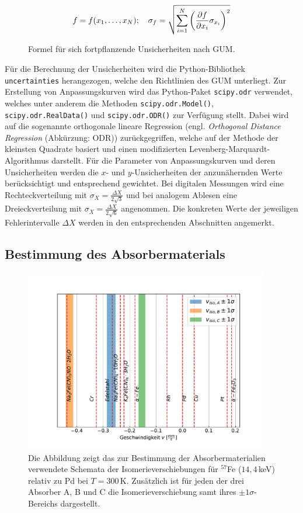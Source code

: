 \documentclass[
a4paper,                %
titlepage=firstiscover, %
captions=tableheading,  %
toc=bibliography,       %
toc=listof,             %
oneside,                %
automark,               %
12pt,                   %
english, ngerman,       %
parskip = half,         %
]{scrartcl}
\begin{document}
\begin{figure}[H]
	\centering
	\begin{align*}
	f = f(x_1, \dots , x_N)
	;\quad
	\sigma_f = \sqrt{\sum_{i = 1}^{N}\left(\pdv{f}{x_i} \sigma_{x_i}\right) ^2}
	\end{align*}
	\caption{Formel für sich fortpflanzende Unsicherheiten nach GUM.}
	\label{fig:GUM_formula}
\end{figure}

\noindent Für die Berechnung der Unsicherheiten wird die Python-Bibliothek \texttt{uncertainties} herangezogen, welche den Richtlinien des GUM unterliegt.
Zur Erstellung von Anpassungskurven wird das Python-Paket \texttt{scipy.odr} verwendet, welches unter anderem die Methoden \texttt{scipy.odr.Model()}, \texttt{scipy.odr.RealData()} und \texttt{scipy.odr.ODR()} zur Verfügung stellt.
Dabei wird auf die sogenannte orthogonale lineare Regression (engl. \emph{Orthogonal Distance Regression} (Abkürzung: ODR)) zurückgegriffen, welche auf der Methode der kleinsten Quadrate basiert und einen modifizierten Levenberg-Marquardt-Algorithmus darstellt.
Für die Parameter von Anpassungskurven und deren Unsicherheiten werden die $x$- und $y$-Unsicherheiten der anzunähernden Werte berücksichtigt und entsprechend gewichtet.
Bei digitalen Messungen wird eine Rechteckverteilung mit $\sigma_X = \frac{\Delta X}{2\sqrt{3}}$ und bei analogem Ablesen eine Dreieckverteilung mit $\sigma_X = \frac{\Delta X}{2\sqrt{6}}$ angenommen.
Die konkreten Werte der jeweiligen Fehlerintervalle $\Delta X$ werden in den entsprechenden Abschnitten angemerkt.


\subsection*{Bestimmung des Absorbermaterials}

\begin{figure}[H]
	\centering
	\includegraphics[width=0.95\textwidth]{dat/isoVgl.pdf}
	\caption{Die Abbildung zeigt das zur Bestimmung der Absorbermaterialien verwendete Schemata der Isomerieverschiebungen für $^{57}$Fe ($14,4\,$keV) relativ zu Pd bei $T=300\,$K. Zusätzlich ist für jeden der drei Absorber A, B und C die Isomerieverschiebung samt ihres $\pm1\sigma$-Bereichs dargestellt.}
	\label{fig:isoVgl}
\end{figure}
\end{document}
